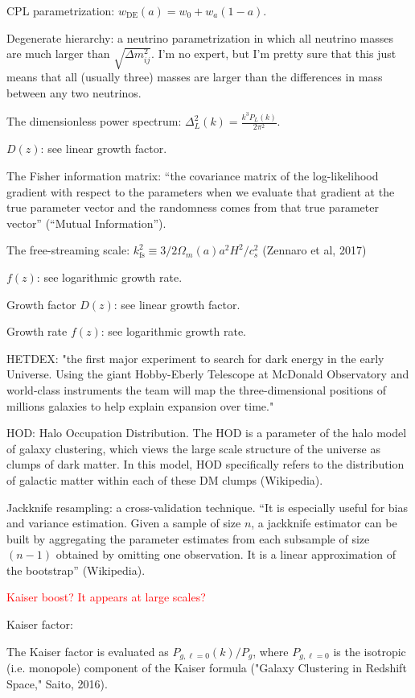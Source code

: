 \documentclass[11pt]{article}
\begin{document}
CPL parametrization: $w_\text{DE}(a) = w_0 + w_a (1 - a)$.

Degenerate hierarchy: a neutrino parametrization in which all
neutrino masses are much larger than $\sqrt{\Delta m_{ij}^2}$. I'm no expert,
but I'm pretty sure that this just means that all (usually three) masses are
larger than
the differences in mass between any two neutrinos.

The dimensionless power spectrum: $\Delta_L^2(k) = \frac{k^3 P_L(k)}{2 \pi^2}$.

$D(z)$: see linear growth factor.

The Fisher information matrix: ``the covariance matrix of the log-likelihood
gradient with respect to the parameters when we evaluate that gradient at the
true parameter vector and the randomness comes from that true parameter
vector'' (``Mutual Information'').

The free-streaming scale:
$k_\text{fs}^2 \equiv 3/2 \Omega_m(a) a^2 H^2 / c_s^2$
(Zennaro et al, 2017)

$f(z)$: see logarithmic growth rate.

Growth factor $D(z)$: see linear growth factor.

Growth rate $f(z)$: see logarithmic growth rate.

HETDEX: "the first major experiment to search for dark energy in the
early Universe. Using the giant Hobby-Eberly Telescope at McDonald Observatory
and world-class instruments the team will map the three-dimensional positions
of millions galaxies to help explain expansion over time."

HOD: Halo Occupation Distribution. The HOD is a parameter of the halo model of
galaxy clustering, which views the large scale structure of the universe as
clumps of dark matter. In this model, HOD specifically refers to the
distribution of galactic matter within each of these DM clumps (Wikipedia).

Jackknife resampling: a cross-validation technique. ``It is especially useful
for bias and variance estimation. Given a sample of size $n$, a jackknife
estimator can be built by aggregating the parameter estimates from each
subsample of size $(n - 1)$ obtained by omitting one observation. It is a
linear approximation of the bootstrap'' (Wikipedia).

\textcolor{red}{Kaiser boost? It appears at large scales?}

Kaiser factor:

The Kaiser factor is evaluated as $P_{g, \ell=0} (k) / P_g$, where
$P_{g, \ell=0}$ is the isotropic (i.e. monopole) component of the Kaiser
formula ("Galaxy Clustering in Redshift Space," Saito, 2016).
\end{document}
